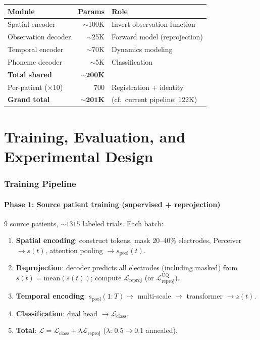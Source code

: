 \documentclass[11pt,letterpaper]{article}
\begin{document}
\begin{table}[h]\centering\small
\begin{tabular}{@{}lrl@{}}
\toprule
\textbf{Module} & \textbf{Params} & \textbf{Role} \\
\midrule
Spatial encoder & ${\sim}$100K & Invert observation function \\
Observation decoder & ${\sim}$25K & Forward model (reprojection) \\
Temporal encoder & ${\sim}$70K & Dynamics modeling \\
Phoneme decoder & ${\sim}$5K & Classification \\
\midrule
\textbf{Total shared} & $\mathbf{{\sim}200}$\textbf{K} & \\
Per-patient ($\times 10$) & 700 & Registration + identity \\
\textbf{Grand total} & $\mathbf{{\sim}201}$\textbf{K} & (cf.\ current pipeline: 122K) \\
\bottomrule
\end{tabular}
\end{table}



\part{Training, Evaluation, and Experimental Design}

\section{Training Pipeline}

\subsection{Phase 1: Source patient training (supervised + reprojection)}

9 source patients, ${\sim}1315$ labeled trials. Each batch:
\begin{enumerate}[leftmargin=2em]
\item \textbf{Spatial encoding}: construct tokens, mask 20--40\% electrodes, Perceiver $\to s(t)$, attention pooling $\to s_{\text{pool}}(t)$.
\item \textbf{Reprojection}: decoder predicts all electrodes (including masked) from $\bar{s}(t) = \text{mean}(s(t))$; compute $\mathcal{L}_{\text{reproj}}$ (or $\mathcal{L}_{\text{reproj}}^{\text{UQ}}$).
\item \textbf{Temporal encoding}: $s_{\text{pool}}(1{:}T) \to$ multi-scale $\to$ transformer $\to z(t)$.
\item \textbf{Classification}: dual head $\to \mathcal{L}_{\text{class}}$.
\item \textbf{Total}: $\mathcal{L} = \mathcal{L}_{\text{class}} + \lambda \mathcal{L}_{\text{reproj}}$ ($\lambda$: $0.5 \to 0.1$ annealed).
\end{enumerate}
\end{document}
